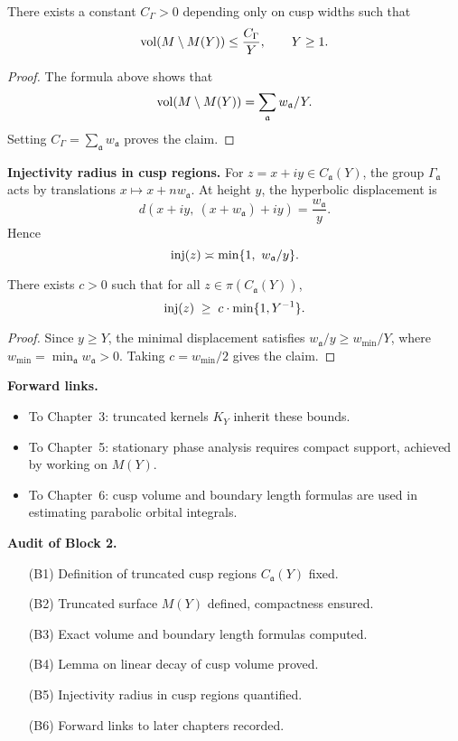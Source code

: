 \begin{lemma}
There exists a constant $C_{\Gamma}>0$ depending only on cusp widths
such that
\[
  \operatorname{vol}(M \setminus M(Y)) \le \frac{C_{\Gamma}}{Y}, \qquad Y \ge 1.
\]
\end{lemma}

\begin{proof}
The formula above shows that
\[
  \operatorname{vol}(M \setminus M(Y)) = \sum_{\mathfrak{a}} w_{\mathfrak{a}} / Y.
\]
Setting $C_{\Gamma} = \sum_{\mathfrak{a}} w_{\mathfrak{a}}$ proves the claim.
\end{proof}

\medskip
\noindent
\textbf{Injectivity radius in cusp regions.}
For $z=x+iy \in C_{\mathfrak{a}}(Y)$, the group $\Gamma_{\mathfrak{a}}$
acts by translations $x \mapsto x+ n w_{\mathfrak{a}}$.
At height $y$, the hyperbolic displacement is
\[
  d(x+iy,\ (x+w_{\mathfrak{a}})+iy) = \frac{w_{\mathfrak{a}}}{y}.
\]
Hence
\[
  \inj(z) \asymp \min\{1,\ w_{\mathfrak{a}}/y\}.
\]

\begin{lemma}
There exists $c>0$ such that for all $z \in \pi(C_{\mathfrak{a}}(Y))$,
\[
  \operatorname{inj}(z) \;\ge\; c \cdot \min\{1, Y^{-1}\}.
\]
\end{lemma}

\begin{proof}
Since $y \ge Y$, the minimal displacement satisfies
$w_{\mathfrak{a}}/y \ge w_{\min}/Y$, 
where $w_{\min} = \min_{\mathfrak{a}} w_{\mathfrak{a}}>0$.
Taking $c=w_{\min}/2$ gives the claim.
\end{proof}

\medskip
\noindent
\textbf{Forward links.}
\begin{itemize}
  \item To Chapter~3: truncated kernels $K_{Y}$ inherit these bounds.
  \item To Chapter~5: stationary phase analysis requires compact support,
        achieved by working on $M(Y)$.
  \item To Chapter~6: cusp volume and boundary length formulas
        are used in estimating parabolic orbital integrals.
\end{itemize}

\medskip
\noindent
\textbf{Audit of Block 2.}
\begin{itemize}
  \item[(B1)] Definition of truncated cusp regions $C_{\mathfrak{a}}(Y)$ fixed.
  \item[(B2)] Truncated surface $M(Y)$ defined, compactness ensured.
  \item[(B3)] Exact volume and boundary length formulas computed.
  \item[(B4)] Lemma on linear decay of cusp volume proved.
  \item[(B5)] Injectivity radius in cusp regions quantified.
  \item[(B6)] Forward links to later chapters recorded.
\end{itemize}

